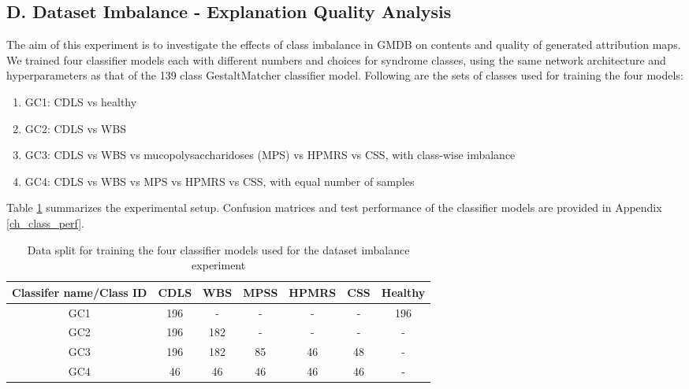 \documentclass[../report.tex]{subfiles}
\begin{document}
    \subsection{D. Dataset Imbalance - Explanation Quality Analysis}
    The aim of this experiment is to investigate the effects of class imbalance in GMDB on contents and quality of generated attribution maps. We trained four classifier models each with different numbers and choices for syndrome classes, using the same network architecture and hyperparameters as that of the 139 class GestaltMatcher classifier model. Following are the sets of classes used for training the four models:
    \begin{enumerate}
    	\item GC1: CDLS vs healthy 
    	\item GC2: CDLS vs WBS
    	\item GC3: CDLS vs WBS vs mucopolysaccharidoses (MPS) vs HPMRS vs CSS, with class-wise imbalance 
    	\item GC4: CDLS vs WBS vs MPS vs HPMRS vs CSS, with equal number of samples
    \end{enumerate} 
   Table \ref{tab_xai_imb_split} summarizes the experimental setup. Confusion matrices and test performance of the classifier models are provided in Appendix \ref{ch_class_perf}.
    \begin{table}[H]
    	\centering
    	\begin{tabular}{|c|c|c|c|c|c|c|}
    		\hline
    		Classifer name/Class ID & CDLS & WBS & MPSS & HPMRS & CSS & Healthy \\ \hline
    		GC1                     & 196  & -   & -    & -     & -   & 196     \\ \hline
    		GC2                     & 196  & 182 & -    & -     & -   & -       \\ \hline
    		GC3                     & 196  & 182 & 85   & 46    & 48  & -       \\ \hline
    		GC4                     & 46   & 46  & 46   & 46    & 46  & -       \\ \hline
    	\end{tabular}
    \caption{Data split for training the four classifier models used for the dataset imbalance experiment}
    \label{tab_xai_imb_split}
    \end{table}
\end{document}
